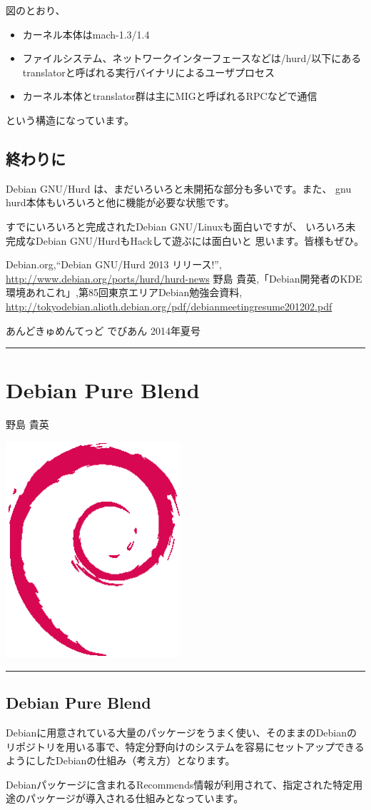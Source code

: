 \documentclass[mingoth,a4paper]{jsarticle}
\renewcommand{\dancersection}[2]{%
\newpage
あんどきゅめんてっど でびあん 2014年夏号
%
\vspace{0.1mm}\\
{\color{dancerdarkblue}\rule{\hsize}{2mm}}

%
%
\begin{minipage}[t]{0.6\hsize}
\color{dancerdarkblue}
\vspace{1cm}
\section{#1}
\hfill{}#2\\
\end{minipage}
\begin{minipage}[t]{0.4\hsize}
\vspace{-2cm}
\hfill{}\includegraphics[height=8cm]{image200502/openlogo-nd.eps}\\
\vspace{-5cm}
\end{minipage}
%
{\color{dancerlightblue}\rule{0.66\hsize}{2mm}}
%
\vspace{2cm}
}
\begin{document}
 図のとおり、

\begin{itemize}
\item カーネル本体はmach-1.3/1.4
\item ファイルシステム、ネットワークインターフェースなどは/hurd/以下にあるtranslatorと呼ばれる実行バイナリによるユーザプロセス
\item カーネル本体とtranslator群は主にMIGと呼ばれるRPCなどで通信
\end{itemize}

という構造になっています。

\subsection{終わりに}

 Debian GNU/Hurd は、まだいろいろと未開拓な部分も多いです。また、
gnu hurd本体もいろいろと他に機能が必要な状態です。

 すでにいろいろと完成されたDebian GNU/Linuxも面白いですが、
いろいろ未完成なDebian GNU/HurdもHackして遊ぶには面白いと
思います。皆様もぜひ。

\begin{thebibliography}{0}
    {\footnotesize{
       Debian.org,``Debian GNU/Hurd 2013 リリース!'',
       \url{http://www.debian.org/ports/hurd/hurd-news}
       }}
    {\footnotesize{
       野島 貴英,「Debian開発者のKDE環境あれこれ」,第85回東京エリアDebian勉強会資料,
       \url{http://tokyodebian.alioth.debian.org/pdf/debianmeetingresume201202.pdf}
       }}
\end{thebibliography}

\dancersection{Debian Pure Blend}{野島 貴英}

\subsection{Debian Pure Blend}

 Debianに用意されている大量のパッケージをうまく使い、そのままのDebianのリポジトリを用いる事で、特定分野向けのシステムを容易にセットアップできるようにしたDebianの仕組み（考え方）となります。

 Debianパッケージに含まれるRecommends情報が利用されて、指定された特定用途のパッケージが導入される仕組みとなっています。
\end{document}
